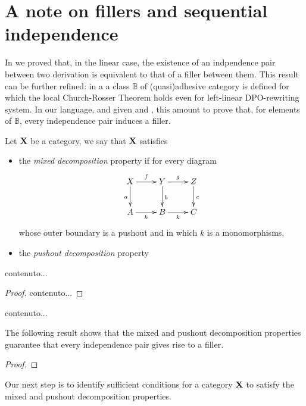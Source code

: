 \documentclass[a4paper,UKenglish,cleveref,pdftex, thm-restate,numberwithinsect]{lipics}
\def\X{\textbf {\textup{X}}}
\begin{document}
\section{A note on fillers and sequential independence}\label{app:fill}
 In  we proved that, in the linear case, the existence of an indpendence pair between two derivation is equivalent to that of a filler between them. This result can be further refined: in a\cite{baldan2011adhesivity} a class  $\mathbb{B}$ of (quasi)adhesive category is defined for which the local Church-Rosser Theorem holds even for left-linear DPO-rewriting system. In our language, and given  and , this amount to prove that, for elements of $\mathbb{B}$, every independence pair induces a filler. 

\begin{definition}Let $\X$ be a category, we say that $\X$ satisfies
	\begin{itemize}
		\item the \emph{mixed decomposition} property if for every diagram
		\[\xymatrix{X \ar[d]_{a} \ar[r]^{f}& \ar[r]^{g} Y \ar[d]^{b}& Z \ar[d]^{c}\\ A \ar[r]_{h}& B \ar[r]_{k}& C}\]
		whose outer boundary is a pushout and in which $k$ is a monomorphisms, 
		\item the \emph{pushout decomposition} property
	\end{itemize}
\end{definition}

\begin{lemma}
	contenuto...
\end{lemma}
\begin{proof}
	contenuto...\qedhere 
\end{proof}

\begin{corollary}
	contenuto...
\end{corollary}

The following result shows that the mixed and pushout decomposition properties guarantee that every independence pair gives rise to a filler.

\begin{theorem}
\end{theorem}
\begin{proof}\qedhere 
\end{proof}

Our next step is to identify sufficient conditions for a category $\X$ to satisfy the mixed and pushout decomposition properties.
\end{document}
